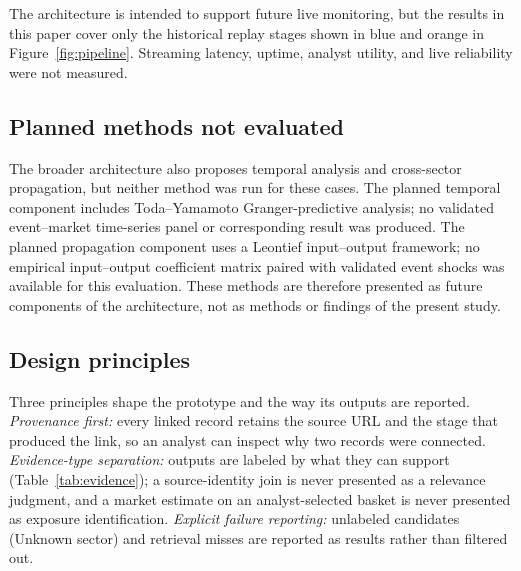 \documentclass[10pt,a4paper,twocolumn]{article}
\begin{document}
The architecture is intended to support future live monitoring, but the results in this paper cover only the historical replay stages shown in blue and orange in Figure~\ref{fig:pipeline}. Streaming latency, uptime, analyst utility, and live reliability were not measured.

\subsection{Planned methods not evaluated}

The broader architecture also proposes temporal analysis and cross-sector propagation, but neither method was run for these cases. The planned temporal component includes Toda--Yamamoto Granger-predictive analysis; no validated event--market time-series panel or corresponding result was produced. The planned propagation component uses a Leontief input--output framework; no empirical input--output coefficient matrix paired with validated event shocks was available for this evaluation. These methods are therefore presented as future components of the architecture, not as methods or findings of the present study.

\subsection{Design principles}

Three principles shape the prototype and the way its outputs are reported.
\emph{Provenance first:} every linked record retains the source URL and the stage that produced the link, so an analyst can inspect why two records were connected.
\emph{Evidence-type separation:} outputs are labeled by what they can support (Table~\ref{tab:evidence}); a source-identity join is never presented as a relevance judgment, and a market estimate on an analyst-selected basket is never presented as exposure identification.
\emph{Explicit failure reporting:} unlabeled candidates (Unknown sector) and retrieval misses are reported as results rather than filtered out.
\end{document}
